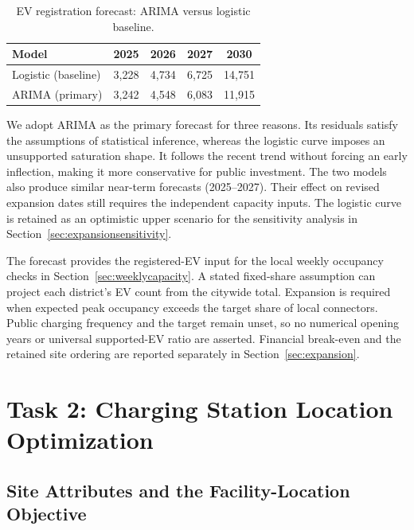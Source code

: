 \documentclass[12pt]{article}
\begin{document}
\begin{table}[H]
\centering
\caption{EV registration forecast: ARIMA versus logistic baseline.}
\label{tab:forecast-compare}
\begin{tabular}{lcccc}
\toprule
Model & 2025 & 2026 & 2027 & 2030 \\
\midrule
Logistic (baseline) & 3{,}228 & 4{,}734 & 6{,}725 & 14{,}751 \\
ARIMA (primary)     & 3{,}242 & 4{,}548 & 6{,}083 & 11{,}915 \\
\bottomrule
\end{tabular}
\end{table}

We adopt ARIMA as the primary forecast for three reasons. Its residuals satisfy the assumptions of statistical inference, whereas the logistic curve imposes an unsupported saturation shape. It follows the recent trend without forcing an early inflection, making it more conservative for public investment. The two models also produce similar near-term forecasts (2025--2027). Their effect on revised expansion dates still requires the independent capacity inputs. The logistic curve is retained as an optimistic upper scenario for the sensitivity analysis in Section~\ref{sec:expansionsensitivity}.

The forecast provides the registered-EV input for the local weekly occupancy checks in Section~\ref{sec:weeklycapacity}. A stated fixed-share assumption can project each district's EV count from the citywide total. Expansion is required when expected peak occupancy exceeds the target share of local connectors. Public charging frequency and the target remain unset, so no numerical opening years or universal supported-EV ratio are asserted. Financial break-even and the retained site ordering are reported separately in Section~\ref{sec:expansion}.

\section{Task 2: Charging Station Location Optimization}

\subsection{Site Attributes and the Facility-Location Objective}
\label{subsec:site-attributes}
\end{document}
